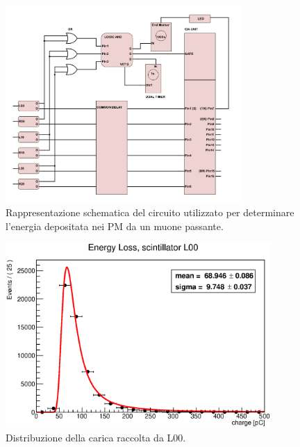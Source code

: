 \begin{figure}[H]
 	\begin{center}
 		\includegraphics[width=0.8\textwidth]{./SCHEMI/Energy.png} %
    \caption{\small Rappresentazione schematica del circuito utilizzato per determinare l'energia depositata nei PM da un muone passante.}
	 	\label{fig:circ-energy}
 	\end{center}
 \end{figure}


 \begin{figure}[H]
   \centering
   \includegraphics[width=0.9\textwidth]{plots/energy_L00.eps}
   \caption{Distribuzione della carica raccolta da L00. }
   \label{fig:L00_energy}
 \end{figure}



